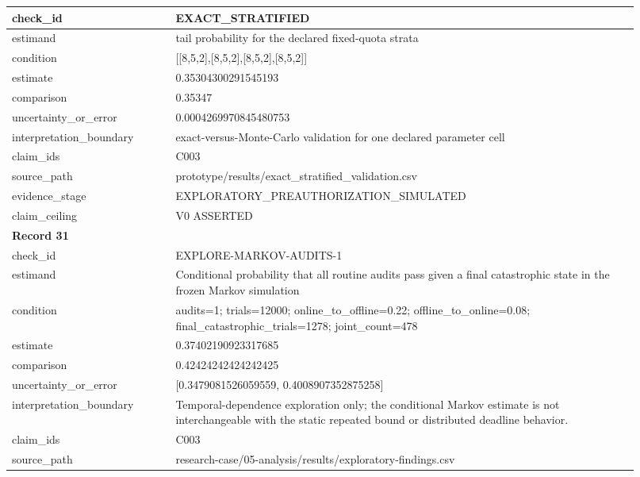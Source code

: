 \begin{longtable}{|p{0.24\linewidth}|p{0.68\linewidth}|}
check\_\allowbreak{}id & EXACT\_\allowbreak{}STRATIFIED \\ \hline
estimand & tail probability for the declared fixed-quota strata \\ \hline
condition & [[8,5,2],[8,5,2],[8,5,2],[8,5,2]] \\ \hline
estimate & 0.35304300291545193 \\ \hline
comparison & 0.35347 \\ \hline
uncertainty\_\allowbreak{}or\_\allowbreak{}error & 0.0004269970845480753 \\ \hline
interpretation\_\allowbreak{}boundary & exact-versus-Monte-Carlo validation for one declared parameter cell \\ \hline
claim\_\allowbreak{}ids & C003 \\ \hline
source\_\allowbreak{}path & prototype/results/exact\_\allowbreak{}stratified\_\allowbreak{}validation.csv \\ \hline
evidence\_\allowbreak{}stage & EXPLORATORY\_\allowbreak{}PREAUTHORIZATION\_\allowbreak{}SIMULATED \\ \hline
claim\_\allowbreak{}ceiling & V0 ASSERTED \\ \hline
\multicolumn{2}{|l|}{\textbf{Record 31}} \\ \hline
check\_\allowbreak{}id & EXPLORE-MARKOV-AUDITS-1 \\ \hline
estimand & Conditional probability that all routine audits pass given a final catastrophic state in the frozen Markov simulation \\ \hline
condition & audits=1;\allowbreak{} trials=12000;\allowbreak{} online\_\allowbreak{}to\_\allowbreak{}offline=0.22;\allowbreak{} offline\_\allowbreak{}to\_\allowbreak{}online=0.08;\allowbreak{} final\_\allowbreak{}catastrophic\_\allowbreak{}trials=1278;\allowbreak{} joint\_\allowbreak{}count=478 \\ \hline
estimate & 0.37402190923317685 \\ \hline
comparison & 0.42424242424242425 \\ \hline
uncertainty\_\allowbreak{}or\_\allowbreak{}error & [0.3479081526059559, 0.4008907352875258] \\ \hline
interpretation\_\allowbreak{}boundary & Temporal-dependence exploration only;\allowbreak{} the conditional Markov estimate is not interchangeable with the static repeated bound or distributed deadline behavior. \\ \hline
claim\_\allowbreak{}ids & C003 \\ \hline
source\_\allowbreak{}path & research-case/05-analysis/results/exploratory-findings.csv \\ \hline

\end{longtable}
